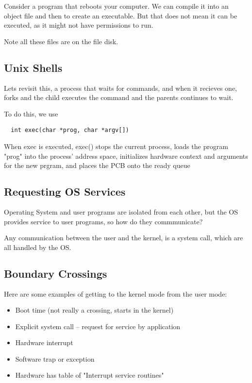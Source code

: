 \documentclass{article}
\begin{document}
Consider a program that reboots your computer. We can compile it into an object file and then to create an executable. But that does not mean it can be executed, as it might not have permissions to run.

Note all these files are on the file disk.

\subsection{Unix Shells}

Lets revisit this, a process that waits for commands, and when it recieves one, forks and the child executes the command and the parents continues to wait.

To do this, we use

\begin{lstlisting}
  int exec(char *prog, char *argv[])
\end{lstlisting}

When exec is executed, exec() stops the current process, loads the program "prog" into the process' address space, initializes hardware context and arguments for the new prgram, and places the PCB onto the ready queue

\subsection{Requesting OS Services}

Operating System and user programs are isolated from each other, but the OS provides service to user programs, so how do they commmunicate?

Any communication between the user and the kernel, is a system call, which are all handled by the OS.

\subsection{Boundary Crossings}

Here are some examples of getting to the kernel mode from the user mode:
\begin{itemize}
  \item Boot time (not really a crossing, starts in the kernel)
  \item Explicit system call -- request for service by application
  \item Hardware interrupt
  \item Software trap or exception
  \item Hardware has table of "Interrupt service routines"
\end{itemize}
\end{document}
